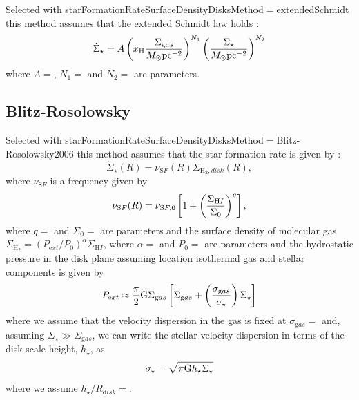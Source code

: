Selected with {\normalfont \ttfamily starFormationRateSurfaceDensityDisksMethod}$=${\normalfont \ttfamily extendedSchmidt} this method assumes that the extended Schmidt law holds \citep{shi_extended_2011}:
\begin{equation}
\dot{\Sigma}_\star = A \left(x_{\mathrm H} {\Sigma_{\mathrm gas}\over M_\odot \hbox{pc}^{-2}}\right)^{N_1} \left({\Sigma_{\star}\over M_\odot \hbox{pc}^{-2}}\right)^{N_2}
\end{equation}
where $A=${\normalfont \ttfamily [starFormationExtendedSchmidtNormalization]}, $N_1=${\normalfont \ttfamily
[starFormationExtendedSchmidtGasExponent]} and $N_2=${\normalfont \ttfamily [starFormationExtendedSchmidtStarExponent]} are parameters.

\subsection{Blitz-Rosolowsky}\label{sec:StarFormationBlitzRosolowsky}

Selected with {\normalfont \ttfamily starFormationRateSurfaceDensityDisksMethod}$=${\normalfont \ttfamily Blitz-Rosolowsky2006} this method assumes that the star formation rate is given by \citep{blitz_role_2006}:
\begin{equation}
 \dot{\Sigma}_\star(R) = \nu_{\mathrm SF}(R) \Sigma_{\mathrm H_2, disk}(R),
\end{equation}
where $\nu_{\mathrm SF}$ is a frequency given by
\begin{equation}
 \nu_{\mathrm SF}(R) = \nu_{\mathrm SF,0} \left[ 1 + \left({\Sigma_{\mathrm HI}\over \Sigma_0}\right)^q \right],
\end{equation}
where $q=${\normalfont \ttfamily [surfaceDensityExponentBlitzRosolowsky]} and $\Sigma_0=${\normalfont \ttfamily [surfaceDensityCriticalBlitzRosolowsky]} are parameters and the surface density of molecular gas $\Sigma_{\mathrm H_2} = (P_{\mathrm ext}/P_0)^\alpha \Sigma_{\mathrm HI}$, where $\alpha=${\normalfont \ttfamily [pressureExponentBlitzRosolowsky]} and $P_0=${\normalfont \ttfamily [pressureCharacteristicBlitzRosolowsky]} are parameters and the hydrostatic pressure in the disk plane assuming location isothermal gas and stellar components is given by
\begin{equation}
 P_{\mathrm ext} \approx {\pi\over 2} \G \Sigma_{\mathrm gas} \left[ \Sigma_{\mathrm gas} + \left({\sigma_{\mathrm gas}\over \sigma_\star}\right)\Sigma_\star\right]
\end{equation}
where we assume that the velocity dispersion in the gas is fixed at $\sigma_{\mathrm gas}=${\normalfont \ttfamily [velocityDispersionDiskGas]} and, assuming $\Sigma_\star \gg \Sigma_{\mathrm gas}$, we can write the stellar velocity dispersion in terms of the disk scale height, $h_\star$, as
\begin{equation}
 \sigma_\star = \sqrt{\pi \G h_\star \Sigma_\star}
\end{equation}
where we assume $h_\star/R_{\mathrm disk}=${\normalfont \ttfamily [heightToRadialScaleDiskBlitzRosolowsky]}.

